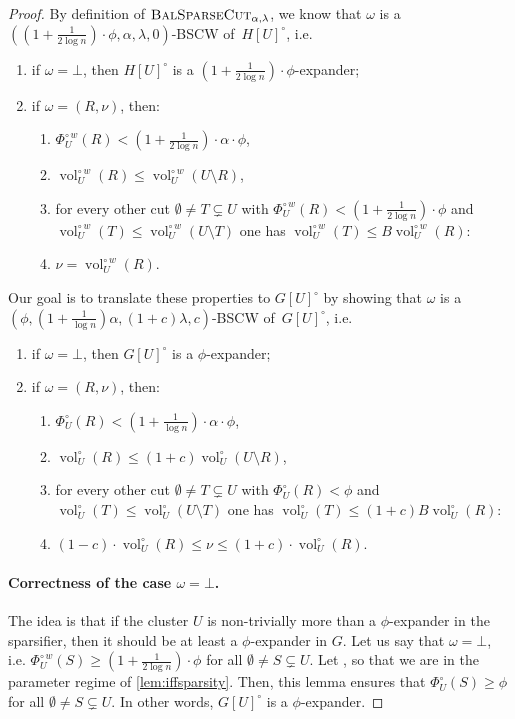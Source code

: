 \documentclass[epsfig,letter,11pt]{article}
\numberwithin{equation}{section}
\newcommand{\unvolc}[2]{\operatorname{vol}_{#2}^\circ (#1)}
\newcommand{\wvolc}[2]{\operatorname{vol}_{#2}^{\circ \,w} (#1)}
\newcommand{\unspc}[2]{\Phi_{#2}^\circ (#1)}
\newcommand{\wspc}[2]{\Phi_{#2}^{\circ \,w} (#1)}
\newcommand{\bsc}{\textsc{BalSparseCut}_{\alpha,\lambda}}
\renewcommand{\hat}{\widehat}
\begin{document}
\begin{proof}[Proof]
	By definition of $\bsc$, we know that $\omega$ is a $((1+\frac{1}{2\log n}) \cdot \phi, \alpha,\lambda,0)$-BSCW of~$H[U]^\circ$, i.e.
	\begin{enumerate}
		\item \label{itdef:exp2} if $\omega=\bot$, then $H[U]^\circ$ is a $(1+\frac{1}{2\log n}) \cdot \phi$-expander;
		\item if $\omega=(R,\nu)$, then:
		\begin{enumerate}
			\item \label{itdef:sparse2} $\wspc{R}{U} < (1+\frac{1}{2\log n}) \cdot \alpha \cdot \phi $,
			\item \label{itdef:smallside2} $\wvolc{R}{U} \le \wvolc{U \setminus R}{U} $,
			\item \label{itdef:bal2} for every other cut $\emptyset \neq T \subsetneq U$ with $\wspc{R}{U} <(1+\frac{1}{2\log n}) \cdot \phi$ and $\wvolc{T}{U} \le \wvolc{U \setminus T}{U}$ one has $\wvolc{T}{U} \le B \wvolc{R}{U} $:
			\item \label{itdef:goodestim2} $\nu =\wvolc{R}{U}$.
		\end{enumerate}
	\end{enumerate}
Our goal is to translate these properties to $G[U]^\circ$ by showing that $\omega$ is a  $(\phi,(1+\frac{1}{\log n})\alpha,(1+c)\lambda,c)$-BSCW of~$G[U]^\circ$, i.e.
\begin{enumerate}
	\item \label{itdef:exp3} if $\omega=\bot$, then $G[U]^\circ$ is a $ \phi$-expander;
	\item if $\omega=(R,\nu)$, then:
	\begin{enumerate}
		\item \label{itdef:sparse3} $\unspc{R}{U} < (1+\frac{1}{\log n}) \cdot\alpha \cdot  \phi $,
		\item \label{itdef:smallside3} $\unvolc{R}{U} \le (1+c)\unvolc{U \setminus R}{U} $,
		\item \label{itdef:bal3} for every other cut $\emptyset \neq T \subsetneq U$ with $\unspc{R}{U} <\phi$ and $\unvolc{T}{U} \le \unvolc{U \setminus T}{U}$ one has $\unvolc{T}{U} \le (1+c)B \unvolc{R}{U} $:
		\item \label{itdef:goodestim3} $(1-c)\cdot\unvolc{R}{U}\le \nu \le (1+c)\cdot\unvolc{R}{U}$.
	\end{enumerate}
\end{enumerate}

	\paragraph{Correctness of the case $\omega = \bot$.} The idea is that if the cluster $U$ is non-trivially more than a $\phi$-expander in the sparsifier, then it should be at least a $\phi$-expander in $G$. Let us say that $\omega=\bot$, i.e. $\wspc{S}{U} \ge  (1+\frac{1}{2\log n})\cdot \phi $ for all $\emptyset \neq S \subsetneq U$. Let \smash{$\hat{\phi}= (1+\frac{1}{2\log n}) \cdot \phi$}, so that we are in the parameter regime of \cref{lem:iffsparsity}. Then, this lemma ensures that $\unspc{S}{U} \ge \phi$ for all $\emptyset \neq S \subsetneq U$. In other words, $G[U]^\circ$ is a $\phi$-expander.
	

\end{proof}
\end{document}
